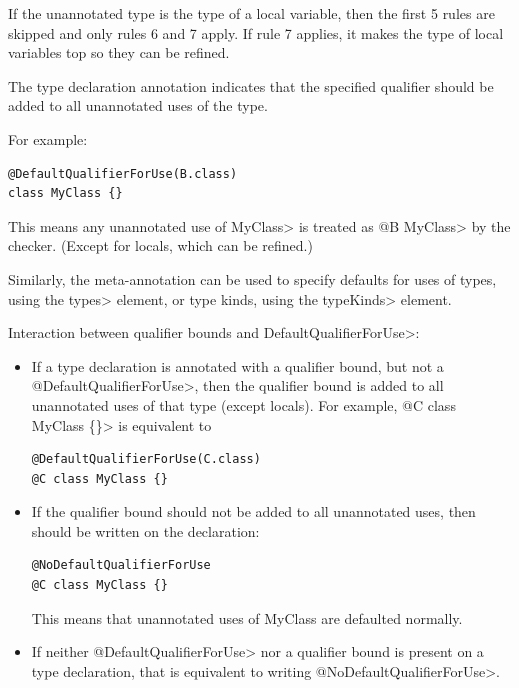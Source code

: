 If the unannotated type is the type of a local variable, then the first 5 rules are skipped and only
rules 6 and 7 apply. If rule 7 applies, it makes the type of local variables top so they can be refined.


The type declaration annotation 
indicates that the specified qualifier should be added to all unannotated uses of the type.

For example:
\begin{Verbatim}
@DefaultQualifierForUse(B.class)
class MyClass {}
\end{Verbatim}

This means any unannotated use of \<MyClass> is treated as \<@B MyClass> by the checker.
(Except for locals, which can be refined.)

Similarly, the meta-annotation  can be used to specify defaults
for uses of types, using the \<types> element, or type kinds, using the \<typeKinds> element.

Interaction between qualifier bounds and \<DefaultQualifierForUse>:
\begin{itemize}
\item
  If a type declaration is annotated with a qualifier bound, but not a \<@DefaultQualifierForUse>,
  then the qualifier bound is added to all unannotated uses of that type (except locals).
  For example, \<@C class MyClass \{\}> is equivalent to
\begin{Verbatim}
@DefaultQualifierForUse(C.class)
@C class MyClass {}
\end{Verbatim}

\item
  If the qualifier bound should not be added to all unannotated uses, then
   should be written on the declaration:
\begin{Verbatim}
@NoDefaultQualifierForUse
@C class MyClass {}
\end{Verbatim}
  This means that unannotated uses of MyClass are defaulted normally.
\item
  If neither \<@DefaultQualifierForUse> nor a qualifier bound is present on a type declaration, that
  is equivalent to writing \<@NoDefaultQualifierForUse>.

\end{itemize}

